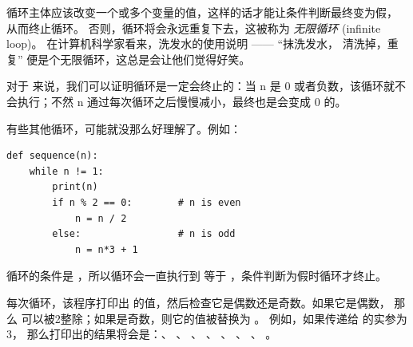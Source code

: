 循环主体应该改变一个或多个变量的值，这样的话才能让条件判断最终变为假，
从而终止循环。 否则，循环将会永远重复下去，这被称为 {\em 无限循环} (infinite loop)。 在计算机科学家看来，洗发水的使用说明 —— ``抹洗发水，
清洗掉，重复'' 便是个无限循环，这总是会让他们觉得好笑。
  


对于  来说，我们可以证明循环是一定会终止的：当 n 是 0 或者负数，该循环就不会执行；不然 n 通过每次循环之后慢慢减小，最终也是会变成 0 的。


有些其他循环，可能就没那么好理解了。例如：

\begin{lstlisting}
def sequence(n):
    while n != 1:
        print(n)
        if n % 2 == 0:        # n is even
            n = n / 2
        else:                 # n is odd
            n = n*3 + 1
\end{lstlisting}

%

循环的条件是 ，所以循环会一直执行到  等于 ，条件判断为假时循环才终止。


每次循环，该程序打印出  的值，然后检查它是偶数还是奇数。如果它是偶数，
那么  可以被2整除；如果是奇数，则它的值被替换为 。 例如，如果传递给  的实参为3， 那么打印出的结果将会是：、 、 、 、 、 、 、 。


